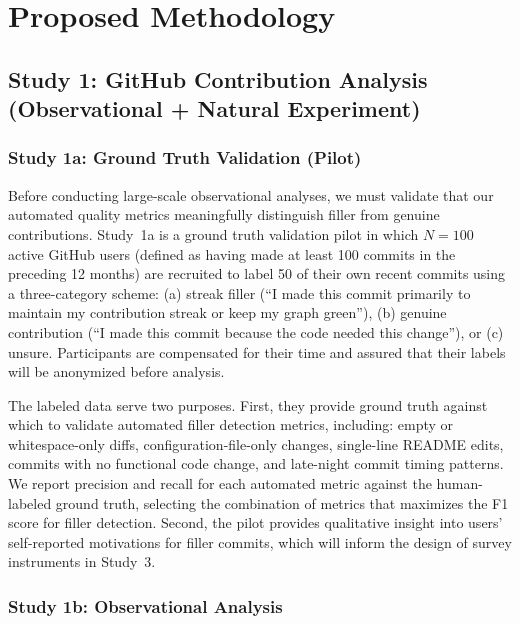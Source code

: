 \documentclass[12pt]{article}
\begin{document}
\section{Proposed Methodology}
\label{sec:methodology}

\subsection{Study 1: GitHub Contribution Analysis (Observational + Natural Experiment)}
\label{sec:study1}

\subsubsection{Study 1a: Ground Truth Validation (Pilot)}
\label{sec:study1a}

Before conducting large-scale observational analyses, we must validate that our automated quality metrics meaningfully distinguish filler from genuine contributions. Study~1a is a ground truth validation pilot in which $N = 100$ active GitHub users (defined as having made at least 100 commits in the preceding 12 months) are recruited to label 50 of their own recent commits using a three-category scheme: (a) streak filler (``I made this commit primarily to maintain my contribution streak or keep my graph green''), (b) genuine contribution (``I made this commit because the code needed this change''), or (c) unsure. Participants are compensated for their time and assured that their labels will be anonymized before analysis.

The labeled data serve two purposes. First, they provide ground truth against which to validate automated filler detection metrics, including: empty or whitespace-only diffs, configuration-file-only changes, single-line README edits, commits with no functional code change, and late-night commit timing patterns. We report precision and recall for each automated metric against the human-labeled ground truth, selecting the combination of metrics that maximizes the F1 score for filler detection. Second, the pilot provides qualitative insight into users' self-reported motivations for filler commits, which will inform the design of survey instruments in Study~3.

\subsubsection{Study 1b: Observational Analysis}
\label{sec:study1b}
\end{document}
